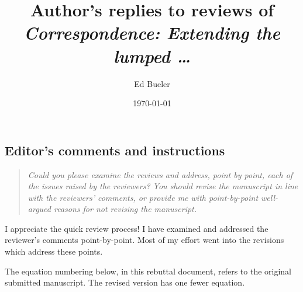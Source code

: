 \documentclass[11pt,reqno]{amsart}
\title[Author's replies to reviews of \emph{Correspondence: Extending \dots}]{Author's replies to reviews of \\ \emph{Correspondence: Extending the lumped \dots}}
\author{Ed Bueler}
\date{\today}
\begin{document}
\maketitle

\thispagestyle{empty}



\subsection*{Editor's comments and instructions}  \begin{quote}
\emph{Could you please examine the reviews and address, point by point, each of the issues raised by the reviewers? You should revise the manuscript in line with the reviewers' comments, or provide me with point-by-point well-argued reasons for not revising the manuscript.}
\end{quote}

\medskip
\noindent I appreciate the quick review process!  I have examined and addressed the reviewer's comments point-by-point.  Most of my effort went into the revisions which address these points.

\medskip
\noindent The equation numbering below, in this rebuttal document, refers to the original submitted manuscript.  The revised version has one fewer equation.
\end{document}

